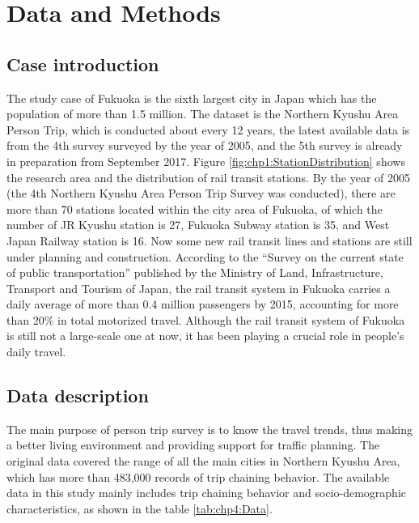 %
\section{Data and Methods}
%
\subsection{Case introduction}
The study case of Fukuoka is the sixth largest city in Japan which has the population of more than 1.5 million. The dataset is the Northern Kyushu Area Person Trip, which is conducted about every 12 years, the latest available data is from the 4th survey surveyed by the year of 2005, and the 5th survey is already in preparation from September 2017. Figure \ref{fig:chp1:StationDistribution} shows the research area and the distribution of rail transit stations. By the year of 2005 (the 4th Northern Kyushu Area Person Trip Survey was conducted), there are more than 70 stations located within the city area of Fukuoka, of which the number of JR Kyushu station is 27, Fukuoka Subway station is 35, and West Japan Railway station is 16. Now some new rail transit lines and stations are still under planning and construction. According to the “Survey on the current state of public transportation” published by the Ministry of Land, Infrastructure, Transport and Tourism of Japan, the rail transit system in Fukuoka carries a daily average of more than 0.4 million passengers by 2015, accounting for more than 20\% in total motorized travel. Although the rail transit system of Fukuoka is still not a large-scale one at now, it has been playing a crucial role in people's daily travel.

%
\subsection{Data description}
The main purpose of person trip survey is to know the travel trends, thus making a better living environment and providing support for traffic planning. The original data covered the range of all the main cities in Northern Kyushu Area, which has more than 483,000 records of trip chaining behavior. The available data in this study mainly includes trip chaining behavior and socio-demographic characteristics, as shown in the table \ref{tab:chp4:Data}.

